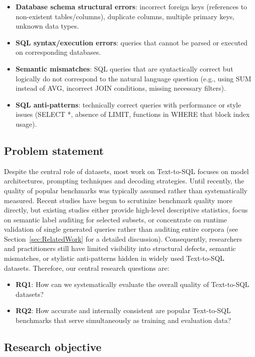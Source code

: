 \documentclass[]{einformatica}
\begin{document}
\begin{itemize}
\item \textbf{Database schema structural errors}: incorrect foreign keys (references to non-existent tables/columns), duplicate columns, multiple primary keys, unknown data types.
\item \textbf{SQL syntax/execution errors}: queries that cannot be parsed or executed on corresponding databases.
\item \textbf{Semantic mismatches}: SQL queries that are syntactically correct but logically do not correspond to the natural language question (e.g., using SUM instead of AVG, incorrect JOIN conditions, missing necessary filters).
\item \textbf{SQL anti-patterns}: technically correct queries with performance or style issues (SELECT *, absence of LIMIT, functions in WHERE that block index usage).
\end{itemize}

\subsection*{Problem statement}
Despite the central role of datasets, most work on Text-to-SQL focuses on model architectures, prompting techniques and decoding strategies. Until recently, the quality of popular benchmarks was typically assumed rather than systematically measured. Recent studies have begun to scrutinize benchmark quality more directly, but existing studies either provide high-level descriptive statistics, focus on semantic label auditing for selected subsets, or concentrate on runtime validation of single generated queries rather than auditing entire corpora (see Section~\ref{sec:RelatedWork} for a detailed discussion). Consequently, researchers and practitioners still have limited visibility into structural defects, semantic mismatches, or stylistic anti-patterns hidden in widely used Text-to-SQL datasets. Therefore, our central research questions are:

\begin{itemize}
\item \textbf{RQ1}: How can we systematically evaluate the overall quality of Text-to-SQL datasets?
\item \textbf{RQ2}: How accurate and internally consistent are popular Text-to-SQL benchmarks that serve simultaneously as training and evaluation data?
\end{itemize}

\subsection*{Research objective}
\end{document}
